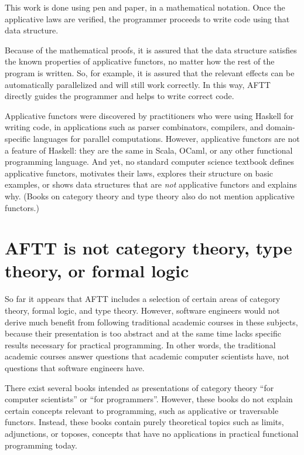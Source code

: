 This work is done using pen and paper, in a mathematical notation.
Once the applicative laws are verified, the programmer proceeds to
write code using that data structure.

Because of the mathematical proofs, it is assured that the data structure
satisfies the known properties of applicative functors, no matter
how the rest of the program is written. So, for example, it is assured
that the relevant effects can be automatically parallelized and will
still work correctly. In this way, AFTT directly guides the programmer
and helps to write correct code.

Applicative functors were discovered by practitioners who were using
Haskell for writing code, in applications such as parser combinators,
compilers, and domain-specific languages for parallel computations.
However, applicative functors are not a feature of Haskell: they are
the same in Scala, OCaml, or any other functional programming language.
And yet, no standard computer science textbook defines applicative
functors, motivates their laws, explores their structure on basic
examples, or shows data structures that are \emph{not} applicative
functors and explains why. (Books on category theory and type theory
also do not mention applicative functors.)

\section{AFTT is not category theory, type theory, or formal logic}

So far it appears that AFTT includes a selection of certain areas
of category theory, formal logic, and type theory. However, software
engineers would not derive much benefit from following traditional
academic courses in these subjects, because their presentation is
too abstract and at the same time lacks specific results necessary
for practical programming. In other words, the traditional academic
courses answer questions that academic computer scientists have, not
questions that software engineers have.

There exist several books intended as presentations of category theory
``for computer scientists'' or ``for programmers''. However, these
books do not explain certain concepts relevant to programming, such
as applicative or traversable functors. Instead, these books contain
purely theoretical topics such as limits, adjunctions, or toposes,
\textendash{} concepts that have no applications in practical functional
programming today.

